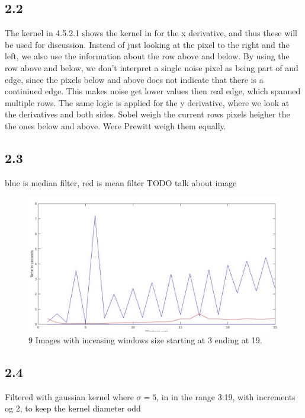 \documentclass[11pt]{report}
\begin{document}
\subsection{2.2}

The kernel in 4.5.2.1 shows the kernel in for the x derivative, and thus these will be used for discussion. Instead of just looking at the pixel to the right and the left, we also use the information about the row above and below. By using the row above and below, we don't interpret a single noise pixel as being part of and edge, since the pixels below and above does not indicate that there is a continiued edge. This makes noise get lower values then real edge, which spanned multiple rows. The same logic is applied for the y derivative, where we look at the derivatives and both sides. Sobel weigh the current rows pixels heigher the the ones below and above. Were Prewitt weigh them equally.



\subsection{2.3}
blue is median filter, red is mean filter
TODO talk about image

\begin{figure}[!ht]
    \centering
    \includegraphics[width=1\textwidth]{fig23.jpg}
    \caption{9 Images with inceasing windows size starting at 3 ending at 19.}
    \label{fig:2_3}
\end{figure}

\subsection{2.4}
Filtered with gaussian kernel where $\sigma = 5$, in in the range 3:19, with increments og 2, to keep the kernel diameter odd
\end{document}
